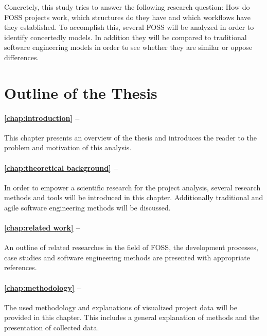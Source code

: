 Concretely, this study tries to answer the following research question: How do
\ac{FOSS} projects work, which structures do they have and which workflows have
they established. To accomplish this, several \ac{FOSS} will be analyzed in
order to identify concertedly models. In addition they will be compared to
traditional software engineering models in order to see whether they are
similar or oppose differences.


\section{Outline of the Thesis} %

\paragraph{\autoref{chap:introduction} -- }

This chapter presents an overview of the thesis and introduces the reader to
the problem and motivation of this analysis.

\paragraph{\autoref{chap:theoretical background} -- }

In order to empower a scientific research for the project analysis, several
research methods and tools will be introduced in this chapter. Additionally
traditional and agile software engineering methods will be discussed.

\paragraph{\autoref{chap:related work} -- }

An outline of related researches in the field of \ac{FOSS}, the development
processes, case studies and software engineering methods are presented with
appropriate references.

\paragraph{\autoref{chap:methodology} -- }

The used methodology and explanations of visualized project data will be
provided in this chapter. This includes a general explanation of methods and
the presentation of collected data.


